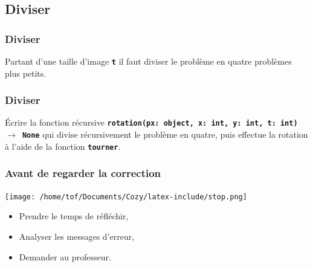 \documentclass[svgnames,11pt]{beamer}
\begin{document}
\subsection{Diviser}
\begin{frame}
    \frametitle{Diviser}
Partant d'une taille d'image \textbf{\texttt{t}} il faut diviser le problème en quatre problèmes plus petits.
    \begin{center}
    \end{center}

\end{frame}
\begin{frame}
    \frametitle{Diviser}
    \begin{center}
    \end{center}
\begin{activite}
Écrire la fonction récursive \textbf{\texttt{rotation(px: object, x: int, y: int, t: int) $\rightarrow$ None}} qui divise récursivement le problème en quatre, puis effectue la rotation à l'aide de la fonction \textbf{\texttt{tourner}}.
\end{activite}
\end{frame}
\begin{frame}
    \frametitle{Avant de regarder la correction}
\begin{center}
    \centering
    \texttt{[image: /home/tof/Documents/Cozy/latex-include/stop.png]}
    \end{center}
{\Large
    \begin{itemize}
        \item Prendre le temps de réfléchir,
        \item Analyser les messages d'erreur,
        \item Demander au professeur.
    \end{itemize}
}
\end{frame}
\end{document}
